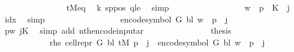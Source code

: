 \begin{isabellebody}
\ \ \ \ \ \ \ \ \ \ \ \ \ \ \isamarkupfalse%
\ tM{\isacharprime}{\kern0pt}{\isacharunderscore}{\kern0pt}eq\ \isamarkupfalse%
\ k{}\ sppos\ qle\ \isamarkupfalse%
\ simp\isanewline
\ \ \ \ \ \ \ \ \ \ \ \ \isamarkupfalse%
\ \isamarkupfalse%
\ {\isachardoublequoteopen}{\isasymdots}\ {\isacharequal}{\kern0pt}\ {\isacharquery}{\kern0pt}w{\isacharprime}{\kern0pt}\ {\isacharbang}{\kern0pt}\ {\isacharparenleft}{\kern0pt}p{}\ {\isacharasterisk}{\kern0pt}\ {\isacharquery}{\kern0pt}K\ {\isacharplus}{\kern0pt}\ j{\isacharparenright}{\kern0pt}{\isachardoublequoteclose}\ \isamarkupfalse%
\ idx\ \isamarkupfalse%
\ simp\isanewline
\ \ \ \ \ \ \ \ \ \ \ \ \isamarkupfalse%
\ \isamarkupfalse%
\ {\isachardoublequoteopen}{\isasymdots}\ {\isacharequal}{\kern0pt}\ encode{\isacharunderscore}{\kern0pt}symbol\ {\isacharquery}{\kern0pt}G\ {\isacharquery}{\kern0pt}bl\ {\isacharparenleft}{\kern0pt}w\ {\isacharbang}{\kern0pt}\ p{}{\isacharparenright}{\kern0pt}\ {\isacharbang}{\kern0pt}\ j{\isachardoublequoteclose}\isanewline
\ \ \ \ \ \ \ \ \ \ \ \ \ \ \isamarkupfalse%
\ p{}w\ jK\ \isamarkupfalse%
\ {\isacharparenleft}{\kern0pt}simp\ add{\isacharcolon}{\kern0pt}\ nth{\isacharunderscore}{\kern0pt}encode{\isacharunderscore}{\kern0pt}input{\isacharunderscore}{\kern0pt}ar{\isacharparenright}{\kern0pt}\isanewline
\ \ \ \ \ \ \ \ \ \ \ \ \isamarkupfalse%
\ \isamarkupfalse%
\ {\isacharquery}{\kern0pt}thesis\ \isakeywordONE{{\isachardot}{\kern0pt}}\isamarkupfalse%
\isanewline
\ \ \ \ \ \ \ \ \ \ \isamarkupfalse%
\isanewline
\ \ \ \ \ \ \ \ \ \ \isamarkupfalse%
\ rhs{\isacharcolon}{\kern0pt}\ {\isachardoublequoteopen}cell{\isacharunderscore}{\kern0pt}repr\ {\isacharquery}{\kern0pt}G\ {\isacharquery}{\kern0pt}bl\ {\isacharparenleft}{\kern0pt}{\isacharquery}{\kern0pt}tM\ p{\isacharparenright}{\kern0pt}\ {\isacharbang}{\kern0pt}\ j\ {\isacharequal}{\kern0pt}\ encode{\isacharunderscore}{\kern0pt}symbol\ {\isacharquery}{\kern0pt}G\ {\isacharquery}{\kern0pt}bl\ {\isacharparenleft}{\kern0pt}w\ {\isacharbang}{\kern0pt}\ p{}{\isacharparenright}{\kern0pt}\ {\isacharbang}{\kern0pt}\ j{\isachardoublequoteclose}\isanewline
\ \ \ \ \ \ \ \ \ \ \isamarkupfalse%
\ {\isacharminus}{\kern0pt}\isanewline
\ \ \ \ \ \ \ \ \ \ \ \ \isamarkupfalse%

\end{isabellebody}
